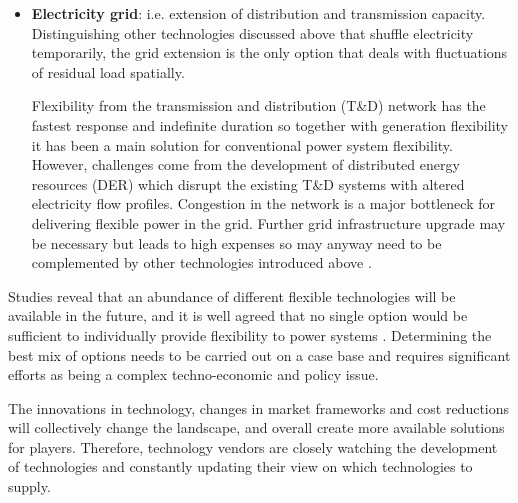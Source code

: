 \begin{itemize}
	\item \textbf{Electricity grid}: i.e. extension of distribution and transmission capacity. Distinguishing other technologies discussed above that shuffle electricity temporarily, the grid extension is the only option that deals with fluctuations of residual load spatially. %
	
	Flexibility from the transmission and distribution (T\&D) network has the fastest response and indefinite duration so together with generation flexibility it has been a main solution for conventional power system flexibility. However, challenges come from the development of distributed energy resources (DER) which disrupt the existing T\&D systems with altered electricity flow profiles. Congestion in the network is a major bottleneck for delivering flexible power in the grid. Further grid infrastructure upgrade may be necessary but leads to high expenses so may anyway need to be complemented by other technologies introduced above \cite{Cochran2014}.
	
\end{itemize}

Studies reveal that an abundance of different flexible technologies will be available in the future, and it is well agreed that no single option would be sufficient to individually provide flexibility to power systems \cite{Cochran2014,Wang2017,Lund2015,Muller2016}. Determining the best mix of options needs to be carried out on a case base and requires significant efforts as being a complex techno-economic and policy issue. 

The innovations in technology, changes in market frameworks and cost reductions will collectively change the landscape, and overall create more available solutions for players. Therefore, technology vendors are closely watching the development of technologies and constantly updating their view on which technologies to supply. 


